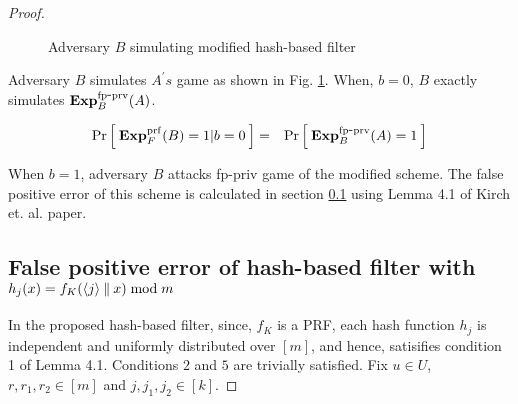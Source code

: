 \begin{proof}

\begin{figure}[h]
\centering
{}
\caption{Adversary $B$ simulating modified hash-based filter}\label{fig:AdvB1}
\end{figure}

Adversary $B$ simulates $A^{'}s$ game as shown in Fig. \ref{fig:AdvB1}. When, $b=0$, $B$ exactly simulates $\mathrm{\mathbf{Exp}}^{\mathrm{fp\mbox{-}prv}}_{B}(A)$. 

\begin{eqnarray*}
\Pr\left[\: \mathbf{Exp}^{\mathrm{prf}}_{F}(B) = 1|b=0 \:\right] &=&  \Pr\left[\: \mathrm{\mathbf{Exp}}^{\mathrm{fp\mbox{-}prv}}_{B}(A)=1 \:\right]
\end{eqnarray*}

When $b=1$, adversary $B$ attacks fp-priv game of the modified scheme. The false positive error of this scheme is calculated in section \ref{sec:fpe_calculation} using Lemma 4.1 of Kirch et. al. paper\cite{xxx}.

\subsection{False positive error of hash-based filter with $h_j(x) = f_{K}(\langle j \rangle \: \| \: x) \bmod m$ }\label{sec:fpe_calculation}

In the proposed hash-based filter, since, $f_K$ is a PRF, each hash function $h_j$ is independent and uniformly distributed over $[m]$, and hence, satisifies condition 1 of Lemma 4.1\cite{xxx}. Conditions $2$ and $5$ are trivially satisfied. Fix $u \in U$, $r, r_1, r_2 \in [m]$ and $j, j_1, j_2 \in [k]$.


\end{proof}
